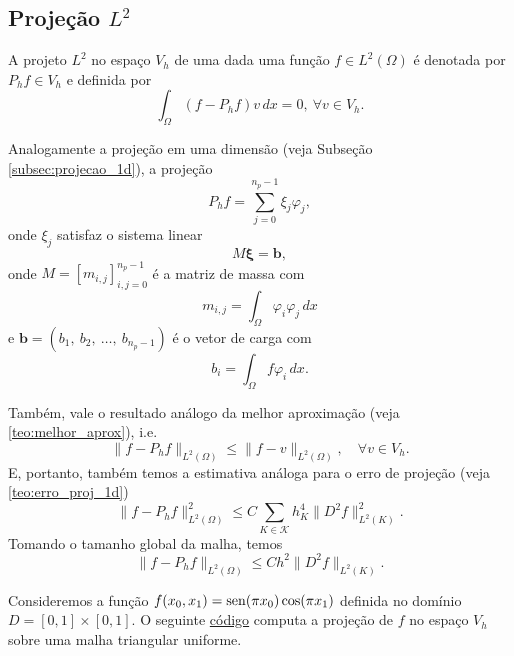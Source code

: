 \subsection{Projeção $L^2$}

A projeto $L^2$ no espaço $V_h$ de uma dada uma função $f\in L^2(\Omega)$  é denotada por $P_hf\in V_h$ e definida por
\begin{equation}
  \int_\Omega (f-P_hf)v\,dx = 0,~\forall v\in V_h.
\end{equation}

Analogamente a projeção em uma dimensão (veja Subseção \ref{subsec:projecao_1d}), a projeção
\begin{equation}
  P_h f = \sum_{j=0}^{n_p-1} \xi_j\varphi_j,
\end{equation}
onde $\xi_j$ satisfaz o sistema linear
\begin{equation}
  M\pmb{\xi} = \pmb{b},
\end{equation}
onde $M = [m_{i,j}]_{i,j=0}^{n_p-1}$ é a matriz de massa com
\begin{equation}
  m_{i,j} = \int_{\Omega} \varphi_i\varphi_j\,dx
\end{equation}
e $\pmb{b} = (b_1,~b_2,~\dotsc,~b_{n_p-1})$ é o vetor de carga com
\begin{equation}
  b_i = \int_\Omega f\varphi_i\,dx.
\end{equation}

Também, vale o resultado análogo da melhor aproximação (veja \ref{teo:melhor_aprox}), i.e.
\begin{equation}
  \|f-P_hf\|_{L^2(\Omega)} \leq \|f - v\|_{L^2(\Omega)},\quad\forall v\in V_h.
\end{equation}
E, portanto, também temos a estimativa análoga para o erro de projeção (veja \ref{teo:erro_proj_1d})
\begin{equation}
  \|f-P_hf\|_{L^2(\Omega)}^2 \leq C\sum_{K\in\mathcal{K}} h_K^4\|D^2 f\|_{L^2(K)}^2.
\end{equation}
Tomando o tamanho global da malha, temos
\begin{equation}\label{eq:erro_projec_2d}
  \|f-P_hf\|_{L^2(\Omega)} \leq Ch^2\|D^2 f\|_{L^2(K)}.
\end{equation}

\ifispython
\begin{ex}\label{ex:projec}
Consideremos a função $f(x_0,x_1) = \operatorname{sen}(\pi x_0)\cos(\pi x_1)$ definida no domínio $D = [0, 1]\times [0, 1]$. O seguinte \href{https://github.com/phkonzen/notas/blob/master/src/MetodoElementosFinitos/cap_mef2d/dados/ex_projec/ex_projec.py}{código} computa a projeção de $f$ no espaço $V_h$ sobre uma malha triangular uniforme.


\end{ex}
\fi


